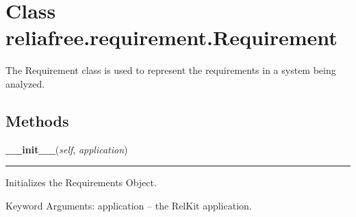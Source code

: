 %
%
%


\section{Class reliafree.requirement.Requirement}

    \label{reliafree:requirement:Requirement}
The Requirement class is used to represent the requirements in a system 
being analyzed.



  \subsection{Methods}

    \label{reliafree:requirement:Requirement:__init__}

    \vspace{0.5ex}

\hspace{.8\funcindent}\begin{boxedminipage}{\funcwidth}

    \raggedright \textbf{\_\_init\_\_}(\textit{self}, \textit{application})

    \vspace{-1.5ex}

    \rule{\textwidth}{0.5\fboxrule}
\setlength{\parskip}{2ex}
    Initializes the Requirements Object.

    Keyword Arguments: application -- the RelKit application.

\setlength{\parskip}{1ex}
    \end{boxedminipage}

